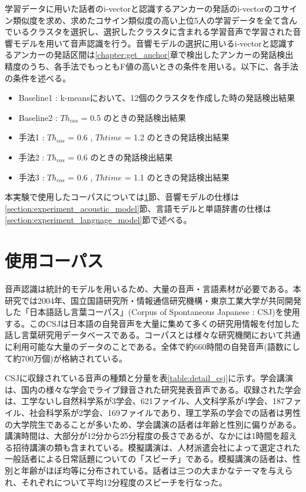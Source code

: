 学習データに用いた話者のi-vectorと認識するアンカーの発話のi-vectorのコサイン類似度を求め、求めたコサイン類似度の高い上位5人の学習データを全て含んでいるクラスタを選択し、選択したクラスタに含まれる学習音声で学習された音響モデルを用いて音声認識を行う。音響モデルの選択に用いるi-vectorと認識するアンカーの発話区間は\ref{chapter:get_anchor}章で検出したアンカーの発話検出精度のうち、各手法でもっともF値の高いときの条件を用いる。以下に、各手法の条件を述べる。\par

\begin{itemize}
  \item Baseline1 : k-meansにおいて、12個のクラスタを作成した時の発話検出結果
  \item Baseline2 : $Th_{cos}$ = 0.5 のときの発話検出結果
  \item 手法1     : $Th_{cos}$ = 0.6 , $Th{time}$ = 1.2 のときの発話検出結果
  \item 手法2     : $Th_{cos}$ = 0.6 のときの発話検出結果
  \item 手法3     : $Th_{cos}$ = 0.6 , $Th{time}$ = 1.1 のときの発話検出結果
  \end{itemize}

本実験で使用したコーパスについては\ref{csj}節、音響モデルの仕様は\ref{section:experiment_acoustic_model}節、言語モデルと単語辞書の仕様は\ref{section:experiment_language_model}節で述べる。

\section{使用コーパス}
\label{csj}
音声認識は統計的モデルを用いるため、大量の音声・言語素材が必要である。本研究では2004年、国立国語研究所・情報通信研究機構・東京工業大学が共同開発した「日本語話し言葉コーパス」(Corpus of Spontaneous Japanese : CSJ)を使用する。このCSJは日本語の自発音声を大量に集めて多くの研究用情報を付加した話し言葉研究用データベースである。コーパスとは様々な研究機関において共通に利用可能な大量のデータのことである。全体で約660時間の自発音声(語数にして約700万個)が格納されている。\par
CSJに収録されている音声の種類と分量を表\ref{table:detail_csj}に示す。学会講演は、国内の様々な学会でライブ録音された研究発表音声である。収録された学会は、工学ないし自然科学系が3学会、621ファイル、人文科学系が4学会、187ファイル、社会科学系が2学会、169ファイルであり、理工学系の学会での話者は男性の大学院生であることが多いため、学会講演の話者は年齢と性別に偏りがある。講演時間は、大部分が12分から25分程度の長さであるが、なかには1時間を超える招待講演の類も含まれている。模擬講演は、人材派遣会社によって選定された一般話者による日常話題についての「スピーチ」である。模擬講演の話者は、性別と年齢がほぼ均等に分布されている。話者は三つの大まかなテーマを与えられ、それぞれについて平均12分程度のスピーチを行なった。\par

